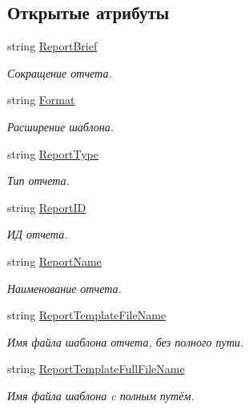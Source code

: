 \subsection*{Открытые атрибуты}
\begin{DoxyCompactItemize}
\item 
string \mbox{\hyperlink{class_f_b_a_1_1_sys_report_x_l_s_x_a12de21f472ac78c628b08cf28baee962}{Report\+Brief}}
\begin{DoxyCompactList}\small\item\em Сокращение отчета. \end{DoxyCompactList}\item 
string \mbox{\hyperlink{class_f_b_a_1_1_sys_report_x_l_s_x_ad8ee59c7792fac71f00b613684e26c99}{Format}}
\begin{DoxyCompactList}\small\item\em Расширение шаблона. \end{DoxyCompactList}\item 
string \mbox{\hyperlink{class_f_b_a_1_1_sys_report_x_l_s_x_add5c56010e8977ef6dbc9313125d776d}{Report\+Type}}
\begin{DoxyCompactList}\small\item\em Тип отчета. \end{DoxyCompactList}\item 
string \mbox{\hyperlink{class_f_b_a_1_1_sys_report_x_l_s_x_a9d958fab0959c006f19167f1c135f091}{Report\+ID}}
\begin{DoxyCompactList}\small\item\em ИД отчета. \end{DoxyCompactList}\item 
string \mbox{\hyperlink{class_f_b_a_1_1_sys_report_x_l_s_x_a6daccec2a0740c58d71f27118a1bc5b0}{Report\+Name}}
\begin{DoxyCompactList}\small\item\em Наименование отчета. \end{DoxyCompactList}\item 
string \mbox{\hyperlink{class_f_b_a_1_1_sys_report_x_l_s_x_ac2a834c332bc22bbe671f2d94e72c0ea}{Report\+Template\+File\+Name}}
\begin{DoxyCompactList}\small\item\em Имя файла шаблона отчета, без полного пути. \end{DoxyCompactList}\item 
string \mbox{\hyperlink{class_f_b_a_1_1_sys_report_x_l_s_x_a3e6d021544ed50cc7ffea55511cd871b}{Report\+Template\+Full\+File\+Name}}
\begin{DoxyCompactList}\small\item\em Имя файла шаблона c полным путём. \end{DoxyCompactList}\item 

\end{DoxyCompactItemize}

